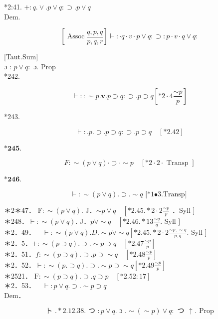 \documentclass[10pt]{article}
\begin{document}
*2:41. $+: q . \vee . p \vee q: \supset . p \vee q$\\
Dem.

$$
\left[\operatorname{Assoc} \frac{q, p, q}{p, q, r}\right] \vdash: \cdot q \cdot v \cdot p \vee q: \supset: p \cdot v \cdot q \vee q:
$$

[Taut.Sum]\\
ɔ : $p \vee q:$ ɔ. Prop\\
*242.

$$
\vdash:: \sim p . \mathbf{v} . p \supset q: \supset . p \supset q\left[* 2 \cdot 4 \frac{\sim p}{p}\right]
$$

*243.

$$
\vdash: . p . \supset . p \supset q: \supset . p \supset q \quad[* 2.42]
$$

$\boldsymbol{*} \mathbf{2} \boldsymbol{4} \boldsymbol{5}$.

$$
F: \sim(p \vee q) \cdot \supset \cdot \sim p \quad[* 2 \cdot 2 \cdot \text { Transp }]
$$

$\boldsymbol{*} \mathbf{2} \boldsymbol{4} \boldsymbol{6}$.

$$
\vdash: \sim(p \vee q) . \supset . \sim q \text { [*1•3.Transp] }
$$

＊2＊47． $\mathrm{F}: \sim(p \vee q)$. J．$\sim p \vee q \quad\left[* 2.45 . * 2 \cdot 2 \frac{\sim p}{p}\right.$ ．Syll $]$\\
＊248．$\vdash: \sim(p \vee q)$. J．$p \vee \sim q \quad\left[* 2.46 . * 13 \frac{\sim q}{q}\right.$. Syll $]$\\
＊2．49．$\quad \vdash: \sim(p \vee q) . D . \sim p \vee \sim q\left[* 2.45 . * 2 \cdot 2 \frac{\sim p, \sim q}{p, q}\right.$. Syll $]$\\
＊2．5．$+: \sim(p \supset q) . \supset . \sim p \supset q \quad\left[* 2.47 \frac{\sim p}{p}\right]$\\
＊2．51．$f: \sim(p \supset q) . \supset . p \supset \sim q \quad\left[* 2.48 \frac{\sim p}{p}\right]$\\
＊2．52．$\vdash: \sim(p . \supset q) . \supset . \sim p \supset \sim q\left[* 2.49 \frac{\sim p}{p}\right]$\\
＊2521． $\mathrm{F}: \sim(p \supset q) . \supset . q \supset p \quad[* 2.52: 17]$\\
＊2．53．$\quad \vdash: p \vee q . \supset . \sim p \supset q$\\
Dem．

$$
\text { ト } . * 2.12 .38 . \text { つ }: p \vee q . \text { ɔ } . \sim(\sim p) \vee q: \text { つ } \text { ↑ . Prop }
$$
\end{document}
